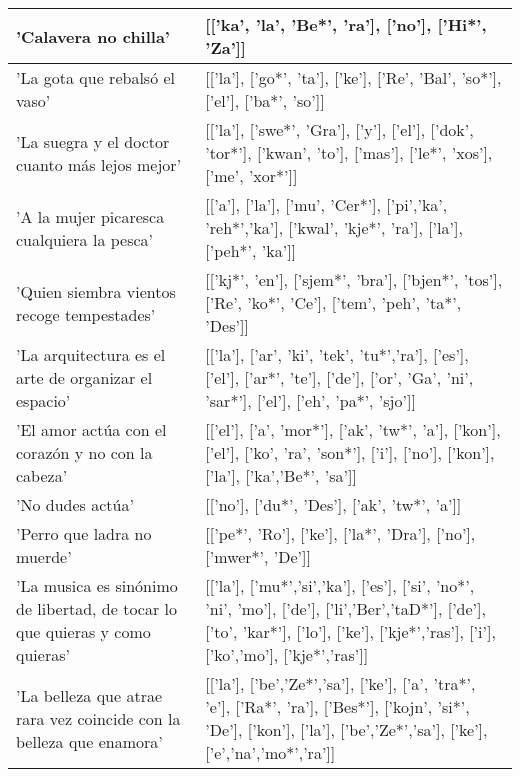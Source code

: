 \begin{longtable}{| p{} | p{} |}
'Calavera no chilla' & [['ka', 'la', 'Be*', 'ra'], ['no'], ['Hi*', 'Za']] \\ \hline
'La gota que rebalsó el vaso' & [['la'], ['go*', 'ta'], ['ke'], ['Re', 'Bal', 'so*'], ['el'], ['ba*', 'so']] \\ \hline
'La suegra y el doctor cuanto más lejos mejor' & [['la'], ['swe*', 'Gra'], ['y'], ['el'], ['dok', 'tor*'], ['kwan', 'to'], ['mas'], ['le*', 'xos'], ['me', 'xor*']] \\ \hline
'A la mujer picaresca cualquiera la pesca' & [['a'], ['la'], ['mu', 'Cer*'], ['pi','ka', 'reh*','ka'], ['kwal', 'kje*', 'ra'], ['la'], ['peh*', 'ka']] \\ \hline
'Quien siembra vientos recoge tempestades' & [['kj*', 'en'], ['sjem*', 'bra'], ['bjen*', 'tos'], ['Re', 'ko*', 'Ce'], ['tem', 'peh', 'ta*', 'Des']] \\ \hline
'La arquitectura es el arte de organizar el espacio' & [['la'], ['ar', 'ki', 'tek', 'tu*','ra'], ['es'], ['el'], ['ar*', 'te'], ['de'], ['or', 'Ga', 'ni', 'sar*'], ['el'], ['eh', 'pa*', 'sjo']] \\ \hline
'El amor actúa con el corazón y no con la cabeza' & [['el'], ['a', 'mor*'], ['ak', 'tw*', 'a'], ['kon'], ['el'], ['ko', 'ra', 'son*'], ['i'], ['no'], ['kon'], ['la'], ['ka','Be*', 'sa']] \\ \hline
'No dudes actúa' & [['no'], ['du*', 'Des'], ['ak', 'tw*', 'a']] \\ \hline
'Perro que ladra no muerde' & [['pe*', 'Ro'], ['ke'], ['la*', 'Dra'], ['no'], ['mwer*', 'De']] \\ \hline
'La musica es sinónimo de libertad, de tocar lo que quieras y como quieras' & [['la'], ['mu*','si','ka'], ['es'], ['si', 'no*', 'ni', 'mo'], ['de'], ['li','Ber','taD*'], ['de'], ['to', 'kar*'], ['lo'], ['ke'], ['kje*','ras'], ['i'], ['ko','mo'], ['kje*','ras']] \\ \hline
'La belleza que atrae rara vez coincide con la belleza que enamora' & [['la'], ['be','Ze*','sa'], ['ke'], ['a', 'tra*', 'e'], ['Ra*', 'ra'], ['Bes*'], ['kojn', 'si*', 'De'], ['kon'], ['la'], ['be','Ze*','sa'], ['ke'], ['e','na','mo*','ra']] \\ \hline

\end{longtable}
